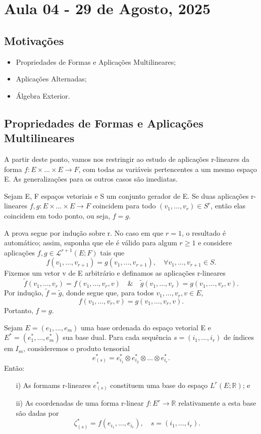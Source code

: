 \documentclass[../differential_forms.tex]{subfiles}
\begin{document}
\section{Aula 04 - 29 de Agosto, 2025}
\subsection{Motivações}
\begin{itemize}
	\item Propriedades de Formas e Aplicações Multilineares;
	\item Aplicações Alternadas;
	\item Álgebra Exterior.
\end{itemize}
\subsection{Propriedades de Formas e Aplicações Multilineares}
A partir deste ponto, vamos nos restringir ao estudo de aplicações r-lineares da forma \(f:E\times \dotsc \times E\rightarrow F\), com todas as variáveis pertencentes a um mesmo espaço E. As generalizações para os outros casos são imediatas.
\begin{prop*}
	Sejam E, F espaços vetoriais e S um conjunto gerador de E. Se duas aplicações r-lineares \(f, g:E\times \dotsc \times E\rightarrow F\) coincidem para todo \((v_1,\dotsc ,v_{r})\in S^{r}\), então elas coincidem em todo ponto, ou seja, \(f=g\).
\end{prop*}
\begin{proof*}
	A prova segue por indução sobre r. No caso em que \(r=1\), o resultado é automático; assim, suponha que ele é válido para algum \(r\geq 1\) e considere aplicações \(f, g\in \mathcal{L}^{r+1}(E; F)\) tais que
	\[
		f(v_1,\dotsc ,v_{r+1})=g(v_{1}, \dotsc , v_{r+1}),\quad \forall v_1,\dotsc ,v_{r+1}\in S.
	\]
	Fixemos um vetor v de E arbitrário e definamos as aplicações r-lineares
	\[
		\tilde{f}(v_1,\dotsc ,v_{r})=f(v_{1},\dotsc , v _{r}, v) \quad\&\quad \tilde{g}(v_1,\dotsc ,v_{r})=g(v_{1},\dotsc , v_{r}, v).
	\]
	Por indução, \(\tilde{f}=\tilde{g}\), donde segue que, para todos \(v_1,\dotsc , v_r, v\in E\),
	\[
		f(v_{1},\dotsc , v_{r}, v)=g(v_{1},\dotsc , v_{r}, v).
	\]
	Portanto, \(f=g\). \qedsymbol
\end{proof*}
\begin{prop*}
	Sejam \(E=(e_1,\dotsc ,e_{m})\) uma base ordenada do espaço vetorial E e \(E^{*}=(e_{1}^{*}, \dotsc , e_{m}^{*})\) sua base dual. Para cada sequência \(s=(i_1,\dotsc ,i_{r})\) de índices em \(I_{m}\), consideremos o produto tensorial
	\[
		e_{(s)}^{*}=e_{i_1}^{*}\otimes e_{i_2}^{*}\otimes \dotsc \otimes e_{i_r}^{*}.
	\]
	Então:
	\begin{itemize}
		\item[i)] As formams r-lineares \(e_{(s)}^{*}\) constituem uma base do espaço \(L^{r}(E; \mathbb{R})\); e
		\item[ii)] As coordenadas de uma forma r-linear \(f:E^{r}\rightarrow \mathbb{R}\) relativamente a esta base são dadas por
		      \[
			      \zeta_{(s)}^{*}= f(e_{i_1}, \dotsc , e_{i_r}), \quad s=(i_1,\dotsc ,i_{r}).
		      \]
	\end{itemize}
\end{prop*}
\end{document}
